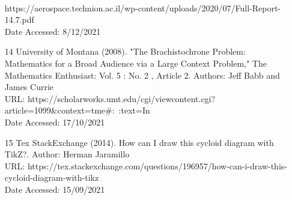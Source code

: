 \documentclass[12pt]{report}
\begin{document}
\begin{itemize}
    \\
    https://aerospace.technion.ac.il/wp-content/uploads/2020/07/Full-Report-14.7.pdf
    \\
    Date Accessed: 8/12/2021
    \item [14] University of Montana (2008). "The Brachistochrone Problem: Mathematics for a Broad Audience via a Large Context Problem," The Mathematics Enthusiast: Vol. 5 : No. 2 , Article 2. Authors: Jeff Babb and James Currie
    \\
    URL: https://scholarworks.umt.edu/cgi/viewcontent.cgi?article=1099&context=tme#:~:text=In
    \\
    Date Accessed: 17/10/2021
    \item [15] Tex StackExchange (2014). How can I draw this cycloid diagram with TikZ?. Author: Herman Jaramillo
    \\
    URL: https://tex.stackexchange.com/questions/196957/how-can-i-draw-this-cycloid-diagram-with-tikz
    \\
    Date Accessed: 15/09/2021
\end{itemize}
\end{document}
